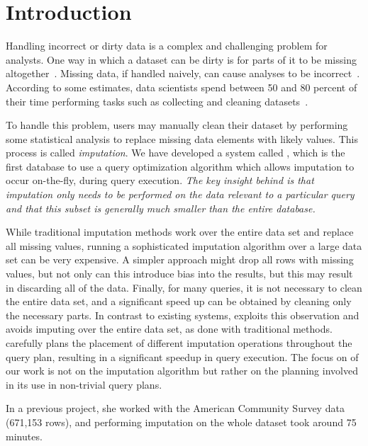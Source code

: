 \section{Introduction}

Handling incorrect or dirty data is a complex and challenging problem for analysts.
One way in which a dataset can be dirty is for parts of it to be missing altogether~\cite{kim2003}.
Missing data, if handled naively, can cause analyses to be incorrect~\cite{rubin1976}.
According to some estimates, data scientists spend between 50 and 80 percent of their time performing tasks such as collecting and cleaning datasets~\cite{data-science-cleaning}.

To handle this problem, users may manually clean their dataset by performing some statistical analysis to replace missing data elements with likely values.
This process is called \emph{imputation}.
We have developed a system called \ProjectName{}, which is the first database to use a query optimization algorithm which allows imputation to occur on-the-fly, during query execution. \emph{The key insight behind \ProjectName{} is that imputation
only needs to be performed on the data relevant to a particular query and
that this subset is generally much smaller than the entire database.} 

While traditional imputation methods work over the entire data set and replace all missing values, running a sophisticated imputation algorithm over a large data set can be very expensive.
A simpler approach might drop all rows with missing values, but not only can this introduce bias into the results, but this may result in discarding all of the data.
Finally, for many queries, it is not necessary to clean the entire data set, and a significant speed up can be obtained by cleaning only the necessary parts.
In contrast to existing systems, \ProjectName{} exploits this observation and avoids imputing over the entire data set, as done with traditional methods. \ProjectName{}
carefully plans the placement of different imputation operations throughout the query plan, resulting in a 
significant speedup in query execution. The focus on of our work is not on the imputation algorithm but rather on the planning involved in its use in non-trivial query plans. 

{In a previous project, she
worked with the American Community Survey data (671,153 rows), and performing imputation on the whole
dataset took around 75 minutes.}

